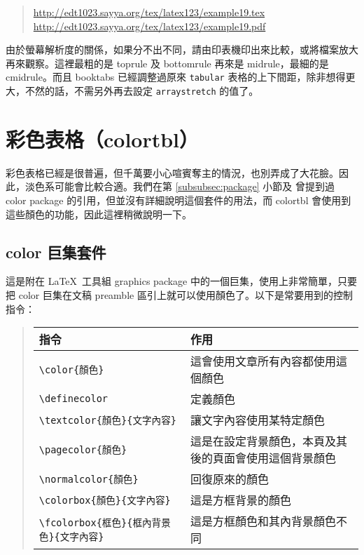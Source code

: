\begin{quote}
  \url{http://edt1023.sayya.org/tex/latex123/example19.tex}\\
  \url{http://edt1023.sayya.org/tex/latex123/example19.pdf}
\end{quote}

由於螢幕解析度的關係，如果分不出不同，請由印表機印出來比較，或將檔案放大再來觀察。這裡最粗的是 {\ttfamily toprule} 及 {\ttfamily bottomrule} 再來是 {\ttfamily midrule}，最細的是 {\ttfamily cmidrule}。而且 \textsf{booktabs} 已經調整過原來 \texttt{tabular} 表格的上下間距，除非想得更大，不然的話，不需另外再去設定 \texttt{arraystretch} 的值了。


\section{彩色表格（colortbl）}

彩色表格已經是很普遍，但千萬要小心喧賓奪主的情況，也別弄成了大花臉。因此，淡色系可能會比較合適。我們在第 \ref{subsubsec:package} 小節及
曾提到過 \textsf{color} package 的引用，但並沒有詳細說明這個套件的用法，而 \textsf{colortbl} 會使用到這些顏色的功能，因此這裡稍微說明一下。

\subsection{color 巨集套件}
\label{subsec:color}

這是附在 \LaTeX\ 工具組 \textsf{graphics} package 中的一個巨集，使用上非常簡單，只要把 \textsf{color} 巨集在文稿 preamble 區引上就可以使用顏色了。以下是常要用到的控制指令：

\begin{quote}
  \begin{tabular}{lp{17em}}
    指令                    & 作用                                                   \\
    \hline
    \verb|\color{顏色}| & 這會使用文章所有內容都使用這個顏色                     \\
    \verb|\definecolor| & 定義顏色                                               \\
    \verb|\textcolor{顏色}{文字內容}| & 讓文字內容使用某特定顏色                               \\
    \verb|\pagecolor{顏色}| & 這是在設定背景顏色，本頁及其後的頁面會使用這個背景顏色 \\
    \verb|\normalcolor{顏色}| & 回復原來的顏色                                         \\
    \verb|\colorbox{顏色}{文字內容}| & 這是方框背景的顏色                                     \\
    \verb|\fcolorbox{框色}{框內背景色}{文字內容}| & 這是方框顏色和其內背景顏色不同
  \end{tabular}
\end{quote}

